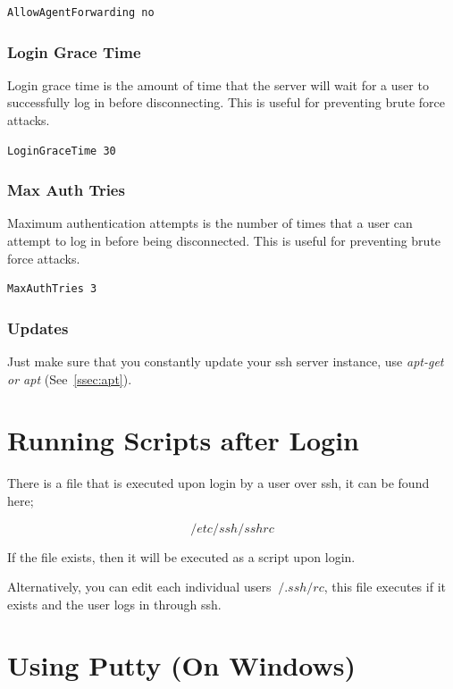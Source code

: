 \begin{verbatim}
AllowAgentForwarding no
\end{verbatim}

\subsubsection{Login Grace Time}

Login grace time is the amount of time that the server will wait for a user to successfully log in before disconnecting.  This is useful for preventing brute force attacks.

\begin{verbatim}
LoginGraceTime 30
\end{verbatim}

\subsubsection{Max Auth Tries}

Maximum authentication attempts is the number of times that a user can attempt to log in before being disconnected.  This is useful for preventing brute force attacks.

\begin{verbatim}
MaxAuthTries 3
\end{verbatim}

\subsubsection{Updates}

Just make sure that you constantly update your ssh server instance, use \textit{apt-get or apt} (See~\autoref{ssec:apt}).


\section{Running Scripts after Login}

There is a file that is executed upon login by a user over ssh, it can be found here;

$$/etc/ssh/sshrc$$

If the file exists, then it will be executed as a script upon login.

Alternatively, you can edit each individual users $~/.ssh/rc$, this file executes if it exists and the user logs in through ssh.


\section{Using Putty (On Windows)}
\label{sec:putty}

